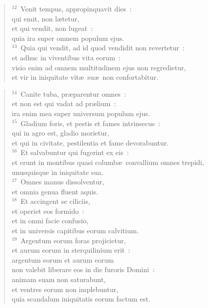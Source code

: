 \begin{flushleft}
\begin{verse}
${}^{12}$~Venit tempus, appropinquavit dies~:\\ qui emit, non l\ae tetur,\\ et qui vendit, non lugeat~:\\ quia ira super omnem populum ejus.\\
${}^{13}$~Quia qui vendit, ad id quod vendidit non revertetur~:\\ et adhuc in viventibus vita eorum~:\\ visio enim ad omnem multitudinem ejus non regredietur,\\ et vir in iniquitate vit\ae\ su\ae\ non confortabitur.\end{verse}\end{flushleft}


\begin{flushleft}\begin{verse}${}^{14}$~Canite tuba, pr\ae parentur omnes~:\\ et non est qui vadat ad pr\ae lium~:\\ ira enim mea super universum populum ejus.\\
${}^{15}$~Gladium foris, et pestis et fames intrinsecus~:\\ qui in agro est, gladio morietur,\\ et qui in civitate, pestilentia et fame devorabuntur.\\
${}^{16}$~Et salvabuntur qui fugerint ex eis~:\\ et erunt in montibus quasi columb\ae\ convallium omnes trepidi,\\ unusquisque in iniquitate sua.\\
${}^{17}$~Omnes manus dissolventur,\\ et omnia genua fluent aquis.\\
${}^{18}$~Et accingent se ciliciis,\\ et operiet eos formido~:\\ et in omni facie confusio,\\ et in universis capitibus eorum calvitium.\\
${}^{19}$~Argentum eorum foras projicietur,\\ et aurum eorum in sterquilinium erit~:\\ argentum eorum et aurum eorum\\ non valebit liberare eos in die furoris Domini~:\\ animam suam non saturabunt,\\ et ventres eorum non implebuntur,\\ quia scandalum iniquitatis eorum factum est.\\

\end{verse}
\end{flushleft}
